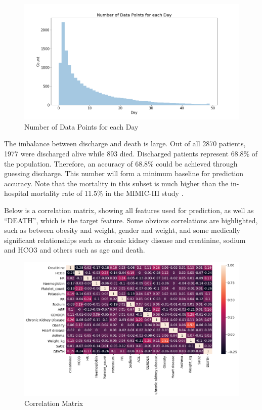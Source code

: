 \documentclass[12pt]{article}
\begin{document}
\begin{figure}[H]
\centering\caption{Number of Data Points for each Day}
\includegraphics[scale=0.45]{Number of Data Points for each Day.png}
\end{figure}
The imbalance between discharge and death is large. Out of all 2870 patients, 1977 were discharged alive while 893 died. Discharged patients represent 68.8\% of the population. Therefore, an accuracy of 68.8\% could be achieved through guessing discharge. This number will form a minimum baseline for prediction accuracy. Note that the mortality in this subset is much higher than the in-hospital mortality rate of 11.5\% in the MIMIC-III study \cite{MIMICIIIdatabase}. 

Below is a correlation matrix, showing all features used for prediction, as well as ``DEATH'', which is the target feature. Some obvious correlations are highlighted, such as between obesity and weight, gender and weight, and some medically significant relationships such as chronic kidney disease and creatinine, sodium and HCO3 and others such as age and death.

\begin{figure}[H]
\centering\caption{Correlation Matrix}
\includegraphics[scale=0.45]{Correlation Matrix.png}
\end{figure}
\end{document}
